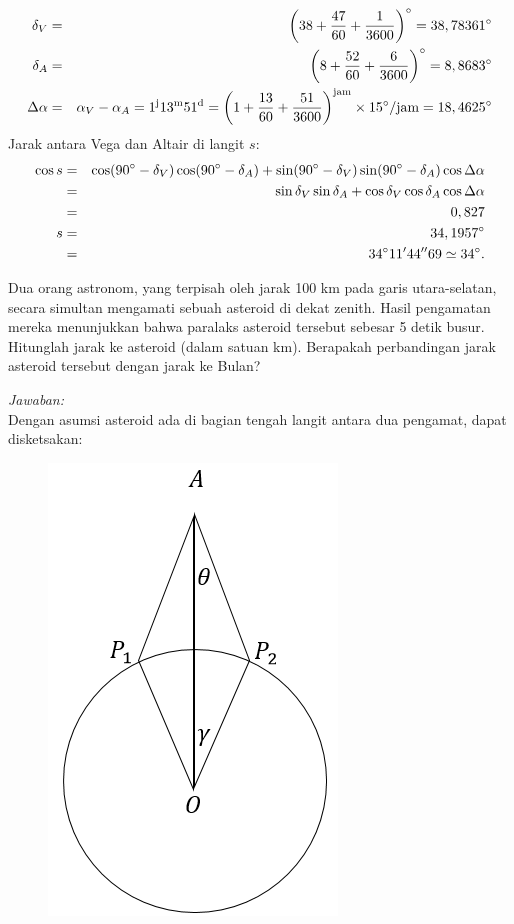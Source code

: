 \documentclass[11pt,fleqn]{exam}
\begin{document}
\begin{questions}
\begin{eqnarray*}
\delta_V&=& \left(38+\frac{47}{60}+\frac{1}{3600}\right)\degree =38,78361\degree \\
\delta_A&=& \left(8+\frac{52}{60}+\frac{6}{3600}\right)\degree =8,8683\degree \\
\Delta\alpha&=&\alpha_V-\alpha_A=1^\text{j}13^\text{m}51^\text{d}=\left(1+\frac{13}{60}+\frac{51}{3600}\right)^{\text{jam}}\times 15\degree{/\text{jam}}=18,4625\degree
\end{eqnarray*}
Jarak antara Vega dan Altair di langit $s$:
\begin{eqnarray*}
\cos s&=&\cos(90\degree-\delta_V)\cos(90\degree-\delta_A)+\sin(90\degree-\delta_V)\sin(90\degree-\delta_A)\cos \Delta\alpha\\
&=&\sin \delta_V\sin \delta_A+\cos \delta_V\cos \delta_A\cos \Delta\alpha\\
&=&0,827\\
s&=&34,1957\degree\\
&=&34\degree11'44''69 \simeq 34\degree.
\end{eqnarray*}


\question Dua orang astronom, yang terpisah oleh jarak 100 km pada garis utara\--selatan, secara simultan mengamati sebuah asteroid di dekat zenith. Hasil pengamatan mereka menunjukkan bahwa paralaks asteroid tersebut sebesar 5 detik busur. Hitunglah jarak ke asteroid (dalam satuan km). Berapakah perbandingan jarak asteroid tersebut dengan jarak ke Bulan?

\textit{Jawaban: }\\
Dengan asumsi asteroid ada di bagian tengah langit antara dua pengamat, dapat disketsakan:
\begin{figure}[h!]
\centering
\includegraphics[scale=0.55]{asteroid.PNG}
\end{figure}


\end{questions}
\end{document}
